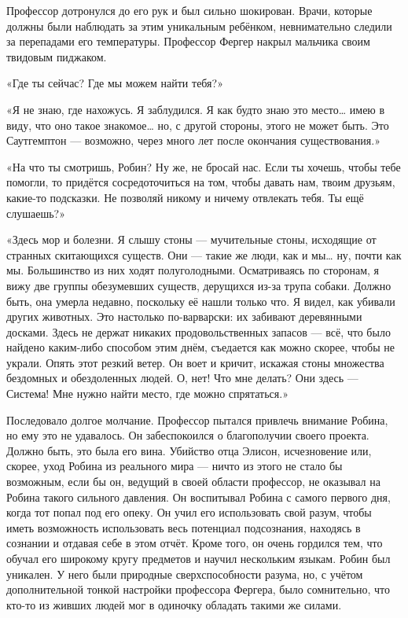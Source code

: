\documentclass[a4paper,12pt]{book}
\begin{document}
\par
Профессор дотронулся до его рук и был сильно шокирован. Врачи, которые должны были наблюдать за этим уникальным ребёнком, невнимательно следили за перепадами его температуры. Профессор Фергер накрыл мальчика своим твидовым пиджаком.
\par
«Где ты сейчас? Где мы можем найти тебя?»
\par
«Я не знаю, где нахожусь. Я заблудился. Я как будто знаю это место… имею в виду, что оно такое знакомое… но, с другой стороны, этого не может быть. Это Саутгемптон — возможно, через много лет после окончания существования.»\\
\par
«На что ты смотришь, Робин? Ну же, не бросай нас. Если ты хочешь, чтобы тебе помогли, то придётся сосредоточиться на том, чтобы давать нам, твоим друзьям, какие-то подсказки. Не позволяй никому и ничему отвлекать тебя. Ты ещё слушаешь?»
\par
«Здесь мор и болезни. Я слышу стоны — мучительные стоны, исходящие от странных скитающихся существ. Они — такие же люди, как и мы… ну, почти как мы. Большинство из них ходят полуголодными. Осматриваясь по сторонам, я вижу две группы обезумевших существ, дерущихся из-за трупа собаки. Должно быть, она умерла недавно, поскольку её нашли только что. Я видел, как убивали других животных. Это настолько по-варварски: их забивают деревянными досками. Здесь не держат никаких продовольственных запасов — всё, что было найдено каким-либо способом этим днём, съедается как можно скорее, чтобы не украли. Опять этот резкий ветер. Он воет и кричит, искажая стоны множества бездомных и обездоленных людей. О, нет! Что мне делать? Они здесь — Система! Мне нужно найти место, где можно спрятаться.»\\
\par
Последовало долгое молчание. Профессор пытался привлечь внимание Робина, но ему это не удавалось. Он забеспокоился о благополучии своего проекта. Должно быть, это была его вина. Убийство отца Элисон, исчезновение или, скорее, уход Робина из реального мира — ничто из этого не стало бы возможным, если бы он, ведущий в своей области профессор, не оказывал на Робина такого сильного давления. Он воспитывал Робина с самого первого дня, когда тот попал под его опеку. Он учил его использовать свой разум, чтобы иметь возможность использовать весь потенциал подсознания, находясь в сознании и отдавая себе в этом отчёт. Кроме того, он очень гордился тем, что обучал его широкому кругу предметов и научил нескольким языкам. Робин был уникален. У него были природные сверхспособности разума, но, с учётом дополнительной тонкой настройки профессора Фергера, было сомнительно, что кто-то из живших людей мог в одиночку обладать такими же силами.\\
\end{document}

